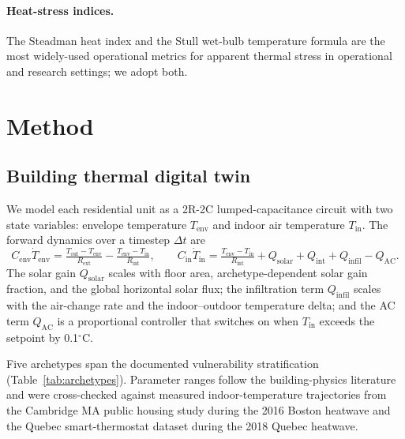 \documentclass[11pt]{article}
\begin{document}
\paragraph{Heat-stress indices.}  The Steadman heat index \citep{steadman1979heatindex} and the Stull wet-bulb temperature formula \citep{stull2011wetbulb} are the most widely-used operational metrics for apparent thermal stress in operational and research settings; we adopt both.

\section{Method}

\subsection{Building thermal digital twin}

We model each residential unit as a 2R-2C lumped-capacitance circuit with two state variables: envelope temperature $T_{\text{env}}$ and indoor air temperature $T_{\text{in}}$.  The forward dynamics over a timestep $\Delta t$ are
\[
C_{\text{env}} \dot T_{\text{env}}
  = \tfrac{T_{\text{out}} - T_{\text{env}}}{R_{\text{ext}}}
  - \tfrac{T_{\text{env}} - T_{\text{in}}}{R_{\text{int}}},
\qquad
C_{\text{in}} \dot T_{\text{in}}
  = \tfrac{T_{\text{env}} - T_{\text{in}}}{R_{\text{int}}}
  + Q_{\text{solar}} + Q_{\text{int}} + Q_{\text{infil}} - Q_{\text{AC}}.
\]
The solar gain $Q_{\text{solar}}$ scales with floor area, archetype-dependent solar gain fraction, and the global horizontal solar flux; the infiltration term $Q_{\text{infil}}$ scales with the air-change rate and the indoor--outdoor temperature delta; and the AC term $Q_{\text{AC}}$ is a proportional controller that switches on when $T_{\text{in}}$ exceeds the setpoint by 0.1$^\circ$C.

Five archetypes span the documented vulnerability stratification (Table~\ref{tab:archetypes}).  Parameter ranges follow the building-physics literature and were cross-checked against measured indoor-temperature trajectories from the Cambridge MA public housing study during the 2016 Boston heatwave and the Quebec smart-thermostat dataset during the 2018 Quebec heatwave.
\end{document}
